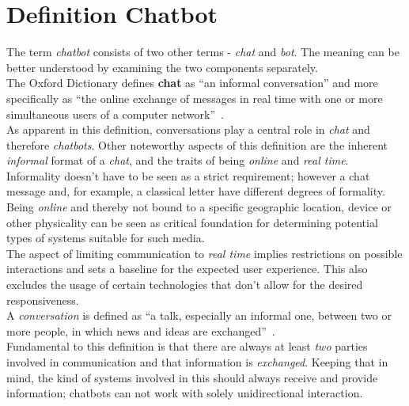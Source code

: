 \section{Definition Chatbot}
\label{defchatbot}


The term \emph{chatbot} consists of two other terms - \emph{chat} and \emph{bot}.
The meaning can be better understood by examining the two components separately.
\\

The Oxford Dictionary defines \textbf{chat} as ``an informal conversation'' and more specifically as ``the online exchange of messages in real time with one or more simultaneous users of a computer network''~\cite{oxfordchat}.
\\
As apparent in this definition, conversations play a central role in \emph{chat} and therefore \emph{chatbots}.
Other noteworthy aspects of this definition are the inherent \emph{informal} format of a \emph{chat},
and the traits of being \emph{online} and \emph{real time}.
\\

Informality doesn't have to be seen as a strict requirement; however a chat message and, for example, a classical letter have different degrees of formality.
\\

Being \emph{online} and thereby not bound to a specific geographic location, device or other physicality can be seen as critical foundation for determining potential types of systems suitable for such media.
\\

The aspect of limiting communication to \emph{real time} implies restrictions on possible interactions and sets a baseline for the expected user experience.
This also excludes the usage of certain technologies that don't allow for the desired responsiveness.
\\

A \emph{conversation} is defined as ``a talk, especially an informal one, between two or more people, in which news and ideas are exchanged''~\cite{oxfordconversation}.
\\
Fundamental to this definition is that there are always at least \emph{two} parties involved in communication and that information is \emph{exchanged}.
Keeping that in mind, the kind of systems involved in this should always receive and provide information;
chatbots can not work with solely unidirectional interaction.
\\

